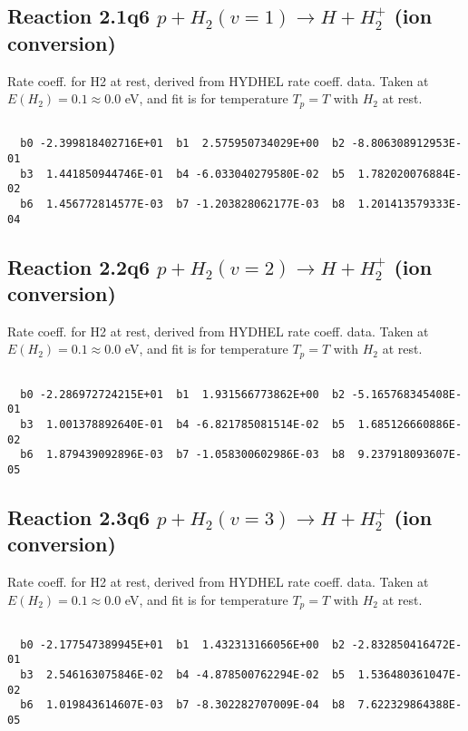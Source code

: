 \newpage
\subsection{
Reaction 2.1q6
$ p + H_2(v=1) \rightarrow H + H_2^+$ (ion conversion)
}
Rate coeff. for H2 at rest, derived from HYDHEL rate coeff. data.
Taken at $E(H_2) = 0.1 \approx 0.0$ eV,  and fit is for temperature $T_p=T$ with $H_2$ at rest.

\begin{small}\begin{verbatim}

  b0 -2.399818402716E+01  b1  2.575950734029E+00  b2 -8.806308912953E-01
  b3  1.441850944746E-01  b4 -6.033040279580E-02  b5  1.782020076884E-02
  b6  1.456772814577E-03  b7 -1.203828062177E-03  b8  1.201413579333E-04

\end{verbatim}\end{small}

\newpage
\subsection{
Reaction 2.2q6
$ p + H_2(v=2) \rightarrow H + H_2^+$ (ion conversion)
}
Rate coeff. for H2 at rest, derived from HYDHEL rate coeff. data.
Taken at $E(H_2) = 0.1 \approx 0.0$ eV,  and fit is for temperature $T_p=T$ with $H_2$ at rest.

\begin{small}\begin{verbatim}

  b0 -2.286972724215E+01  b1  1.931566773862E+00  b2 -5.165768345408E-01
  b3  1.001378892640E-01  b4 -6.821785081514E-02  b5  1.685126660886E-02
  b6  1.879439092896E-03  b7 -1.058300602986E-03  b8  9.237918093607E-05

\end{verbatim}\end{small}

\newpage
\subsection{
Reaction 2.3q6
$ p + H_2(v=3) \rightarrow H + H_2^+$ (ion conversion)
}
Rate coeff. for H2 at rest, derived from HYDHEL rate coeff. data.
Taken at $E(H_2) = 0.1 \approx 0.0$ eV,  and fit is for temperature $T_p=T$ with $H_2$ at rest.

\begin{small}\begin{verbatim}

  b0 -2.177547389945E+01  b1  1.432313166056E+00  b2 -2.832850416472E-01
  b3  2.546163075846E-02  b4 -4.878500762294E-02  b5  1.536480361047E-02
  b6  1.019843614607E-03  b7 -8.302282707009E-04  b8  7.622329864388E-05

\end{verbatim}\end{small}

